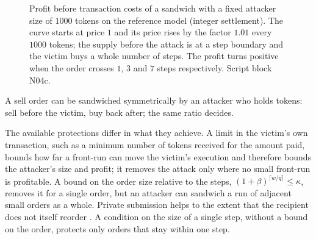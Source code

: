 \begin{figure}[t]
\centering
{}
\caption{Profit before transaction costs of a sandwich with a fixed attacker size of $1000$ tokens on the reference model (integer settlement). The curve starts at price $1$ and its price rises by the factor $1.01$ every $1000$ tokens; the supply before the attack is at a step boundary and the victim buys a whole number of steps. The profit turns positive when the order crosses $1$, $3$ and $7$ steps respectively. Script block N04c.}\label{fig:sandwich}
\end{figure}

A sell order can be sandwiched symmetrically by an attacker who holds tokens: sell before the victim, buy back after; the same ratio decides.

The available protections differ in what they achieve. A limit in the victim's own transaction, such as a minimum number of tokens received for the amount paid, bounds how far a front-run can move the victim's execution and therefore bounds the attacker's size and profit; it removes the attack only where no small front-run is profitable. A bound on the order size relative to the steps, $(1+\beta)^{\lceil w/q\rceil}\le\kappa$, removes it for a single order, but an attacker can sandwich a run of adjacent small orders as a whole. Private submission helps to the extent that the recipient does not itself reorder \citep{zhou2021hft,heimbach2022sandwich}. A condition on the size of a single step, without a bound on the order, protects only orders that stay within one step.

